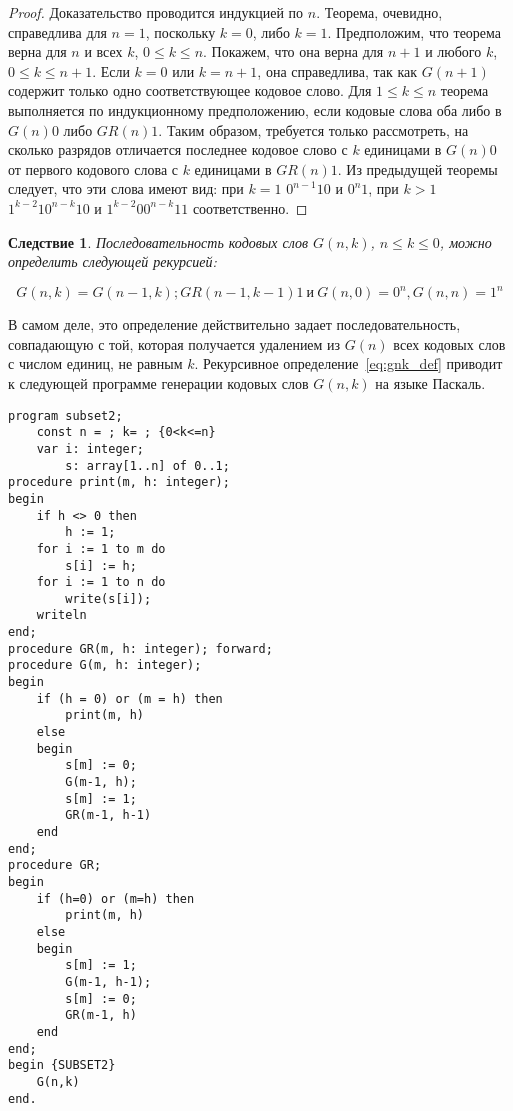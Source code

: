 \documentclass[12pt,a4paper]{article}
\theoremstyle{plain}
\newtheorem*{seq}{Следствие}
\theoremstyle{definition}
\theoremstyle{remark}
\begin{document}
\begin{proof}
Доказательство проводится индукцией по $n$. Теорема, очевидно, справедлива для $n=1$, поскольку $k=0$, либо $k=1$. Предположим, что теорема верна для $n$ и всех $k$, $0\le k\le n$. Покажем, что она верна для $n+1$ и любого $k$, $0\le k\le n+1$. Если $k=0$ или $k=n+1$, она справедлива, так как $G(n+1)$ содержит только одно соответствующее кодовое слово. Для $1\le k\le n$ теорема выполняется по индукционному предположению, если кодовые слова оба либо в $G(n)0$ либо $GR(n)1$. Таким образом, требуется только рассмотреть, на сколько разрядов отличается последнее кодовое слово с $k$ единицами в $G(n)0$ от первого кодового слова с $k$ единицами в $GR(n)1$. Из предыдущей теоремы следует, что эти слова имеют вид: при $k=1$ $0^{n-1}10$ и $0^n1$, при $k>1$ $1^{k-2}10^{n-k}10$ и $1^{k-2}00^{n-k}11$ соответственно.
\end{proof}

\begin{seq}
Последовательность кодовых слов $G(n,k)$, $n\le k\le 0$, можно определить следующей рекурсией:

\begin{equation}
\label{eq:gnk_def}
G(n,k)=G(n-1,k); GR(n-1,k-1)1\:\text{и}\:G(n,0)=0^n, G(n,n)=1^n
\end{equation}
\end{seq}

В самом деле, это определение действительно задает последовательность, совпадающую с той, которая получается удалением из $G(n)$ всех кодовых слов с числом единиц, не равным $k$. Рекурсивное определение~\eqref{eq:gnk_def} приводит к следующей программе генерации кодовых слов $G(n,k)$ на языке Паскаль.

\begin{verbatim}
program subset2;
    const n = ; k= ; {0<k<=n}
    var i: integer;
        s: array[1..n] of 0..1;
procedure print(m, h: integer);
begin
    if h <> 0 then
        h := 1;
    for i := 1 to m do
        s[i] := h;
    for i := 1 to n do
        write(s[i]);
    writeln
end;
procedure GR(m, h: integer); forward;
procedure G(m, h: integer);
begin
    if (h = 0) or (m = h) then
        print(m, h)
    else
    begin
        s[m] := 0; 
        G(m-1, h);
        s[m] := 1; 
        GR(m-1, h-1)
    end
end;
procedure GR;
begin
    if (h=0) or (m=h) then
        print(m, h)
    else
    begin
        s[m] := 1;
        G(m-1, h-1);
        s[m] := 0;
        GR(m-1, h)
    end
end;
begin {SUBSET2}
    G(n,k)
end.
\end{verbatim}
\end{document}
